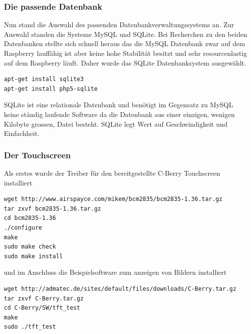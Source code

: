 \documentclass[11pt,a4paper]{article} %
\begin{document}
\subsubsection{Die passende Datenbank}
Nun stand die Auswahl des passenden Datenbankverwaltungssystems an. Zur Auswahl standen die Systeme MySQL und SQLite. Bei Recherchen zu den beiden Datenbanken stellte sich schnell heraus das die MySQL Datenbank zwar auf dem Raspberry lauff\"ahig ist aber keine hohe Stabilit\"at besitzt und sehr resourcenlastig auf dem Raspberry l\"auft. Daher wurde das SQLite Datenbanksystem ausgew\"ahlt.
\begin{frame}

\begin{lstlisting}
apt-get install sqlite3
apt-get install php5-sqlite
\end{lstlisting}

\end{frame}
 SQLite ist eine relationale Datenbank und ben\"otigt im Gegensatz zu MySQL keine st\"andig laufende Software da die Datenbank aus einer einzigen, wenigen Kilobyte grossen, Datei besteht. SQLite  legt Wert auf Geschwindigkeit und Einfachheit.
\par
\subsubsection{Der Touchscreen}
Als erstes wurde der Treiber für den bereitgestellte C-Berry Touchscreen installiert \cite{berry5}
\begin{frame}

\begin{lstlisting}
wget http://www.airspayce.com/mikem/bcm2835/bcm2835-1.36.tar.gz
tar zxvf bcm2835-1.36.tar.gz
cd bcm2835-1.36
./configure
make
sudo make check
sudo make install
\end{lstlisting}

\end{frame}
und im Anschluss die Beispielsoftware zum anzeigen von Bildern installiert
\begin{frame}

\begin{lstlisting}
wget http://admatec.de/sites/default/files/downloads/C-Berry.tar.gz
tar zxvf C-Berry.tar.gz
cd C-Berry/SW/tft_test
make
sudo ./tft_test
\end{lstlisting}

\end{frame}
\end{document}
